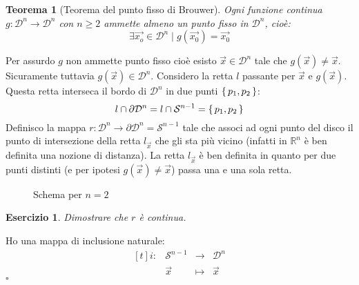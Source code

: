 \documentclass[10pt, twoside=false, x11names]{scrbook}
\newtheorem{theorem}{Teorema}[section]
\newcounter{exercises}
\newtheorem{exercise}[exercises]{Esercizio}
\newenvironment{proof}{{\textbf{Dimostrazione}:}}{\hfill $\square$}
\newcommand{\RN}[1][]{\mathbb{R}^#1}
\newcommand{\Sph}[1][]{\mathcal{S}^#1}
\newcommand{\Disk}[1][]{\mathcal{D}^#1}
\begin{document}
\begin{theorem}[Teorema del punto fisso di Brouwer]
  Ogni funzione continua $ g \colon \Disk{n} \to \Disk{n} $ con $ n \geq 2 $ ammette almeno un punto fisso
  in $ \Disk{n} $, cioè:
  \[
    \exists \vec{x_o} \in \Disk{n} \; | \; g(\vec{x_0}) = \vec{x_0}
  \]
\end{theorem}

\begin{proof}
  Per assurdo $ g $ non ammette punto fisso cioè esisto $ \vec{x} \in \Disk{n} $
  tale che $ g(\vec{x}) \not = \vec{x} $. Sicuramente tuttavia $ g(\vec{x}) \in \Disk{n} $.
  Considero la retta $ l $ passante per $ \vec{x} $ e $ g(\vec{x}) $. Questa retta
  interseca il bordo di $ \Disk{n} $ in due punti $ \set{p_1, p_2} $:
  \[
    l \cap \partial \Disk{n} = l \cap \Sph{n-1} = \set{p_1, p_2}
  \]
  Definisco la mappa $ r \colon \Disk{n} \to \partial \Disk{n} = \Sph{n-1} $ tale che associ
  ad ogni punto del disco il punto di intersezione della retta $ l_{\vec{x}} $ che gli sta più
  vicino (infatti in $ \RN{n} $ è ben definita una nozione di distanza). La retta $ l_{\vec{x}} $
  è ben definita in quanto per due punti distinti (e per ipotesi  $ g(\vec{x}) \not = \vec{x} $)
  passa una e una sola retta.
  \begin{figure}[htbp]
    \centering
    \caption{Schema per $ n = 2 $}
    \label{fig:lez7:brouwer_proof_1}
  \end{figure}
  \begin{exercise}
    Dimostrare che $ r $ è continua.
  \end{exercise}
  Ho una mappa di inclusione naturale:
  \[
    \begin{aligned}[t]
      i \colon &\Sph{n-1} & \to &\Disk{n} \\
      &\vec{x} & \mapsto& \vec{x}

\end{aligned}\]
\end{proof}
\end{document}
